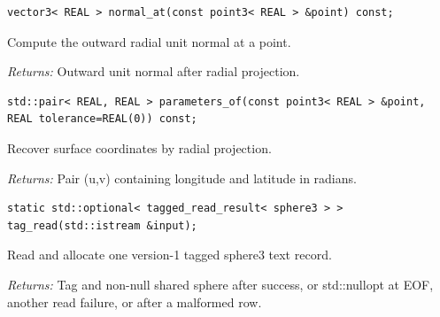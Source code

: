 \par\noindent\begin{minipage}{\linewidth}
\begin{lstlisting}[style=apireference]
vector3< REAL > normal_at(const point3< REAL > &point) const;
\end{lstlisting}
{\footnotesize Compute the outward radial unit normal at a point.\par}
{\footnotesize\textit{Returns:} Outward unit normal after radial projection.\par}
\end{minipage}\par\vspace{1pt}
\par\noindent\begin{minipage}{\linewidth}
\begin{lstlisting}[style=apireference]
std::pair< REAL, REAL > parameters_of(const point3< REAL > &point, REAL tolerance=REAL(0)) const;
\end{lstlisting}
{\footnotesize Recover surface coordinates by radial projection.\par}
{\footnotesize\textit{Returns:} Pair (u,v) containing longitude and latitude in radians.\par}
\end{minipage}\par\vspace{1pt}
\par\noindent\begin{minipage}{\linewidth}
\begin{lstlisting}[style=apireference]
static std::optional< tagged_read_result< sphere3 > > tag_read(std::istream &input);
\end{lstlisting}
{\footnotesize Read and allocate one version-1 tagged sphere3 text record.\par}
{\footnotesize\textit{Returns:} Tag and non-null shared sphere after success, or std::nullopt at EOF, another read failure, or after a malformed row.\par}
\end{minipage}\par\vspace{1pt}
